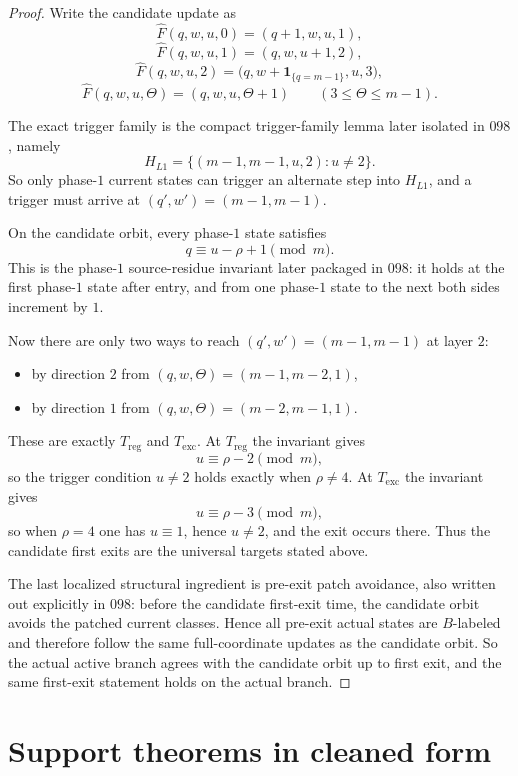 \documentclass[11pt]{article}
\begin{document}
\begin{proof}
Write the candidate update as
\[
\widehat F(q,w,u,0)=(q+1,w,u,1),
\]
\[
\widehat F(q,w,u,1)=(q,w,u+1,2),
\]
\[
\widehat F(q,w,u,2)=\bigl(q,w+\mathbf 1_{\{q=m-1\}},u,3\bigr),
\]
\[
\widehat F(q,w,u,\Theta)=(q,w,u,\Theta+1)
\qquad (3\le \Theta\le m-1).
\]

The exact trigger family is the compact trigger-family lemma later isolated in
$098$, namely
\[
H_{L1}=\{(m-1,m-1,u,2):u\neq 2\}.
\]
So only phase-$1$ current states can trigger an alternate step into $H_{L1}$,
and a trigger must arrive at $(q',w')=(m-1,m-1)$.

On the candidate orbit, every phase-$1$ state satisfies
\[
q \equiv u-\rho+1 \pmod m.
\]
This is the phase-$1$ source-residue invariant later packaged in $098$: it
holds at the first
phase-$1$ state after entry, and from one phase-$1$ state to the next both
sides increment by $1$.

Now there are only two ways to reach $(q',w')=(m-1,m-1)$ at layer $2$:
\begin{itemize}[leftmargin=2em]
\item by direction $2$ from $(q,w,\Theta)=(m-1,m-2,1)$,
\item by direction $1$ from $(q,w,\Theta)=(m-2,m-1,1)$.
\end{itemize}
These are exactly $T_{\mathrm{reg}}$ and $T_{\mathrm{exc}}$. At
$T_{\mathrm{reg}}$ the invariant gives
\[
u \equiv \rho-2 \pmod m,
\]
so the trigger condition $u\neq 2$ holds exactly when $\rho\neq 4$. At
$T_{\mathrm{exc}}$ the invariant gives
\[
u \equiv \rho-3 \pmod m,
\]
so when $\rho=4$ one has $u\equiv 1$, hence $u\neq 2$, and the exit occurs
there. Thus the candidate first exits are the universal targets stated above.

The last localized structural ingredient is pre-exit patch avoidance, also
written out explicitly in $098$: before the candidate first-exit time, the
candidate orbit avoids the patched current classes. Hence all pre-exit actual
states are $B$-labeled and therefore follow the same full-coordinate updates as
the candidate orbit. So the actual active branch agrees with the candidate
orbit up to first exit, and the same first-exit statement holds on the actual
branch.
\end{proof}

\section{Support theorems in cleaned form}
\end{document}
